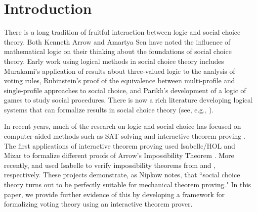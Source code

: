 \documentclass[runningheads]{llncs}
\begin{document}
\section{Introduction}

There is a long tradition of fruitful interaction between logic and social choice theory.  Both Kenneth Arrow \cite[p.~154]{Arrow2014}  and Amartya Sen \cite[p.~108]{Sen2017} have noted the influence of mathematical logic on their thinking about the foundations of social choice theory.  Early work using logical methods in social choice theory includes  Murakami's  \cite{Murakami1968}  application of  results about three-valued logic to the analysis of voting rules, Rubinstein's \cite{Rubinstein1984}  proof of the equivalence between multi-profile and single-profile approaches to social choice, and Parikh's \cite{Parikh1985} development of a logic of games to study social procedures.  There is now a rich literature developing logical systems that can formalize results in social choice theory (see, e.g., \cite{Nipkow2009,Tang2011,Endriss2011,GrandiEndriss2013,CinaEndriss2016,HollidayPacuit2020}). 





In recent years, much of the research on logic and social choice has focused on computer-aided methods such as SAT solving and interactive theorem proving \cite{Geist2017}.  The first applications of interactive theorem proving used Isabelle/HOL  \cite{Nipkow2009} and Mizar \cite{Wiedijk2007} to formalize different proofs of  Arrow's Impossibility Theorem \cite{Geanakoplos2005}.  More recently, \cite{Brandt2018b} and \cite{Eberl2019} used Isabelle to verify impossibility theorems from \cite{Brandt2018} and \cite{Brandl2018}, respectively.  These projects demonstrate, as Nipkow \cite{Nipkow2009} notes,  that ``social choice theory turns out to be perfectly suitable for mechanical theorem proving."  In this paper, we provide further evidence of this by developing a framework for formalizing voting theory using an interactive theorem prover. 
\end{document}
